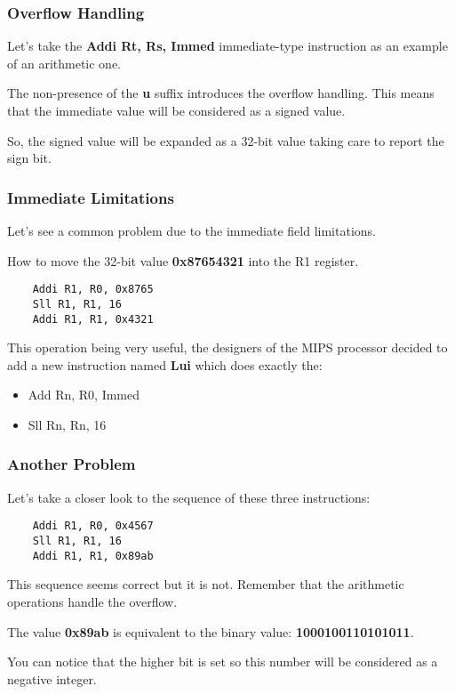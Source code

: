 
\begin{frame}
  \frametitle{Overflow Handling}

  Let's take the \textbf{Addi Rt, Rs, Immed} immediate-type
  instruction as an example of an arithmetic one.

  \-

  The non-presence of the \textbf{u} suffix introduces the overflow
  handling. This means that the immediate value will be considered
  as a signed value.

  \-

  So, the signed value will be expanded as a 32-bit value taking care
  to report the sign bit.

  \begin{center}
  \end{center}
\end{frame}


\begin{frame}[containsverbatim]
  \frametitle{Immediate Limitations}

  Let's see a common problem due to the immediate field limitations.

  \-

  How to move the 32-bit value \textbf{0x87654321} into the R1 register.

  \begin{verbatim}
    Addi R1, R0, 0x8765
    Sll R1, R1, 16
    Addi R1, R1, 0x4321
  \end{verbatim}

  This operation being very useful, the designers of the MIPS processor
  decided to add a new instruction named \textbf{Lui} which does
  exactly the:

  \begin{itemize}
    \item
      Add Rn, R0, Immed
    \item
      Sll Rn, Rn, 16
  \end{itemize}
\end{frame}


\begin{frame}[containsverbatim]
  \frametitle{Another Problem}

  Let's take a closer look to the sequence of these three instructions:

  \begin{verbatim}
    Addi R1, R0, 0x4567
    Sll R1, R1, 16
    Addi R1, R1, 0x89ab
  \end{verbatim}

  This sequence seems correct but it is not. Remember that the arithmetic
  operations handle the overflow.

  \-

  The value \textbf{0x89ab} is equivalent to the binary value:
  \textbf{1000100110101011}.

  \-

  You can notice that the higher bit is set so this number will be considered
  as a negative integer.
\end{frame}

